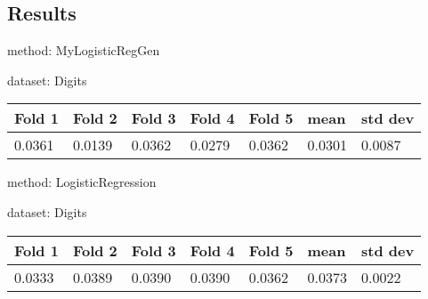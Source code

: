 \documentclass{article}
\begin{document}
\subsection{Results}

\hfill \break

\noindent method: MyLogisticRegGen

\noindent dataset: Digits

\begin{center}
	\begin{tabular}  { | l | l | l | l | l | l | l | }
	\hline
	Fold 1 & Fold 2 & Fold 3 & Fold 4 & Fold 5 & mean & std dev\\ \hline
	0.0361 & 0.0139 & 0.0362 & 0.0279 & 0.0362 & 0.0301 & 0.0087\\
	\hline
	\end{tabular}
\end{center}
\noindent method: LogisticRegression

\noindent dataset: Digits

\begin{center}
	\begin{tabular}  { | l | l | l | l | l | l | l | }
	\hline
	Fold 1 & Fold 2 & Fold 3 & Fold 4 & Fold 5 & mean & std dev\\ \hline
	0.0333 & 0.0389 & 0.0390 & 0.0390 & 0.0362 & 0.0373 & 0.0022\\
	\hline
	\end{tabular}
\end{center}
\end{document}
